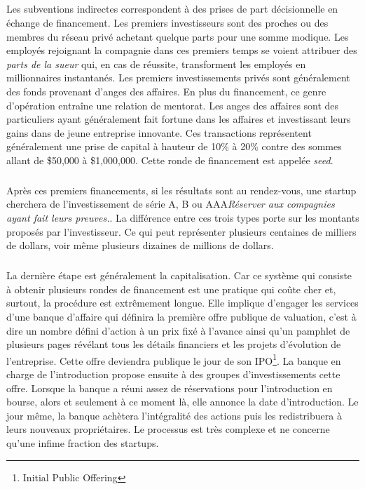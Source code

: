 \documentclass[11pt, a4paper ]{article}
\begin{document}
\begin{spacing}{1.5}
\subparagraph{}
Les subventions indirectes correspondent à des prises de part décisionnelle en échange de financement. Les premiers investisseurs sont des proches ou des membres du réseau privé achetant quelque parts pour une somme modique. Les employés rejoignant la compagnie dans ces premiers temps se voient attribuer des \emph{parts de la sueur} qui, en cas de réussite, transforment les employés en millionnaires instantanés.
Les premiers investissements privés sont généralement des fonds provenant d'anges des affaires. En plus du financement, ce genre d'opération entraîne une relation de mentorat. Les anges des affaires sont des particuliers ayant généralement fait fortune dans les affaires et investissant leurs gains dans de jeune entreprise innovante. Ces transactions représentent généralement une prise de capital à hauteur de 10\% à 20\% contre des sommes allant de \$50,000 à \$1,000,000. Cette ronde de financement est appelée \emph{seed}.

\subparagraph{}
Après ces premiers financements, si les résultats sont au rendez-vous, une startup cherchera de l'investissement de série A, B ou AAA\emph{Réserver aux compagnies ayant fait leurs preuves.}. La différence entre ces trois types porte sur les montants proposés par l'investisseur. Ce qui peut représenter plusieurs centaines de milliers de dollars, voir même plusieurs dizaines de millions de dollars.

\subparagraph{}
La dernière étape est généralement la capitalisation. Car ce système qui consiste à obtenir plusieurs rondes de financement est une pratique qui coûte cher et, surtout, la procédure est extrêmement longue. Elle implique d'engager les services d'une banque d'affaire qui définira la première offre publique de valuation, c'est à dire un nombre défini d'action à un prix fixé à l'avance ainsi qu'un pamphlet de plusieurs pages révélant tous les détails financiers et les projets d'évolution de l'entreprise. Cette offre deviendra publique le jour de son IPO\footnote{Initial Public Offering}. La banque en charge de l'introduction propose ensuite à des groupes d'investissements cette offre. Lorsque la banque a réuni assez de réservations pour l'introduction en bourse, alors et seulement à ce moment là, elle annonce la date d'introduction.  Le jour même, la banque achètera l'intégralité des actions puis les redistribuera à leurs nouveaux propriétaires.
Le processus est très complexe et ne concerne qu'une infime fraction des startups.


\end{spacing}
\end{document}
